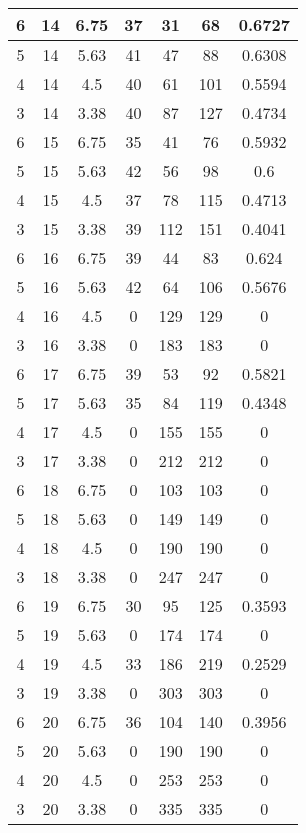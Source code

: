 \documentclass[letterpaper, 12pt]{article}
\begin{document}
\begin{longtable}{|c|c|c|c|c|c|c|}
6 & 14 & 6.75 & 37 & 31 & 68 & 0.6727 \\
\hline
5 & 14 & 5.63 & 41 & 47 & 88 & 0.6308 \\
\hline
4 & 14 & 4.5 & 40 & 61 & 101 & 0.5594 \\
\hline
3 & 14 & 3.38 & 40 & 87 & 127 & 0.4734 \\
\hline
6 & 15 & 6.75 & 35 & 41 & 76 & 0.5932 \\
\hline
5 & 15 & 5.63 & 42 & 56 & 98 & 0.6 \\
\hline
4 & 15 & 4.5 & 37 & 78 & 115 & 0.4713 \\
\hline
3 & 15 & 3.38 & 39 & 112 & 151 & 0.4041 \\
\hline
6 & 16 & 6.75 & 39 & 44 & 83 & 0.624 \\
\hline
5 & 16 & 5.63 & 42 & 64 & 106 & 0.5676 \\
\hline
4 & 16 & 4.5 & 0 & 129 & 129 & 0 \\
\hline
3 & 16 & 3.38 & 0 & 183 & 183 & 0 \\
\hline
6 & 17 & 6.75 & 39 & 53 & 92 & 0.5821 \\
\hline
5 & 17 & 5.63 & 35 & 84 & 119 & 0.4348 \\
\hline
4 & 17 & 4.5 & 0 & 155 & 155 & 0 \\
\hline
3 & 17 & 3.38 & 0 & 212 & 212 & 0 \\
\hline
6 & 18 & 6.75 & 0 & 103 & 103 & 0 \\
\hline
5 & 18 & 5.63 & 0 & 149 & 149 & 0 \\
\hline
4 & 18 & 4.5 & 0 & 190 & 190 & 0 \\
\hline
3 & 18 & 3.38 & 0 & 247 & 247 & 0 \\
\hline
6 & 19 & 6.75 & 30 & 95 & 125 & 0.3593 \\
\hline
5 & 19 & 5.63 & 0 & 174 & 174 & 0 \\
\hline
4 & 19 & 4.5 & 33 & 186 & 219 & 0.2529 \\
\hline
3 & 19 & 3.38 & 0 & 303 & 303 & 0 \\
\hline
6 & 20 & 6.75 & 36 & 104 & 140 & 0.3956 \\
\hline
5 & 20 & 5.63 & 0 & 190 & 190 & 0 \\
\hline
4 & 20 & 4.5 & 0 & 253 & 253 & 0 \\
\hline
3 & 20 & 3.38 & 0 & 335 & 335 & 0 \\
\hline
\end{longtable}
\end{document}
